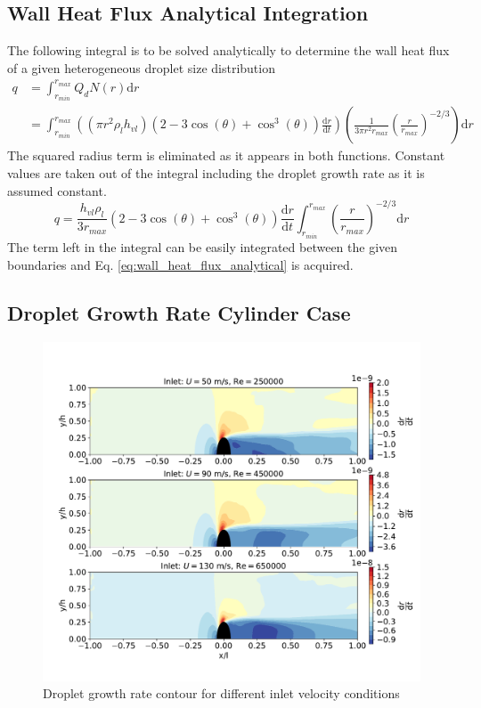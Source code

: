 \documentclass[12pt]{article}
\numberwithin{equation}{section}
\begin{document}
\begin{appendices}
\subsection{Wall Heat Flux Analytical Integration}
The following integral is to be solved analytically to determine the wall heat flux of a given heterogeneous droplet size distribution 
\begin{equation}
    \begin{aligned}
    q&=\int_{r_{min}}^{r_{max}}Q_{d}N(r)\mathrm{d}r\\
    &=\int_{r_{min}}^{r_{max}}\left((\pi r^{2}\rho_{l}h_{vl})(2-3\cos (\theta)+\cos^{3}(\theta) )\frac{\mathrm{d}r}{\mathrm{d}t}\right)
    \left(\frac{1}{3\pi r^{2}r_{max}}\left(\frac{r}{r_{max}}\right)^{-2/3}\right)\mathrm{d}r
    \end{aligned}
\end{equation} 
The squared radius term is eliminated as it appears in both functions. Constant values are taken out of the integral including the droplet growth rate as it is assumed constant.
\begin{equation}
    q=\frac{h_{vl}\rho_{l}}{3r_{max}}(2-3\cos (\theta)+\cos^{3}(\theta) )\frac{\mathrm{d}r}{\mathrm{d}t}\int_{r_{min}}^{r_{max}}\left(\frac{r}{r_{max}}\right)^{-2/3}\mathrm{d}r
\end{equation}
The term left in the integral can be easily integrated between the given boundaries and Eq. \ref{eq:wall_heat_flux_analytical} is acquired.
\subsection{Droplet Growth Rate Cylinder Case}
\begin{figure}[H]
    \centering
    \includegraphics[trim={0 0 0 20},clip,width=1\textwidth]{Figures/drdt_plot_speed_compare.pdf}
    \caption{Droplet growth rate contour for different inlet velocity conditions}
    \label{f:Mass_Fraction_het}
\end{figure}

\end{appendices}
\end{document}
